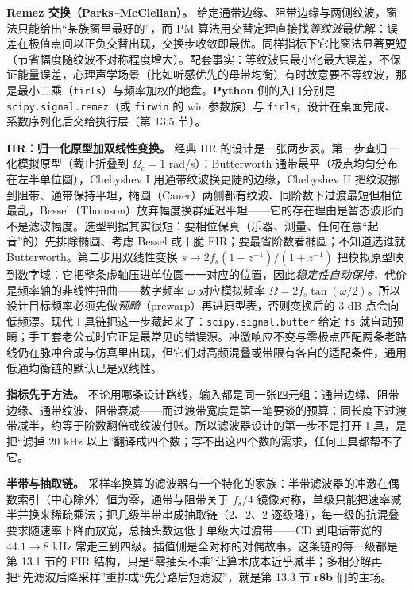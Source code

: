 \documentclass[12pt,a4paper,fontset=fandol]{ctexbook}
\newcommand{\Tp}[1]{\texttt{#1}}
\newcommand{\Lib}[1]{\textbf{#1}}
\newcommand{\Lang}[1]{\textsf{\bfseries #1}}
\newcommand{\PY}{\Lang{Python}}
\begin{document}
\textbf{Remez 交换（Parks--McClellan）。} 给定通带边缘、阻带边缘与两侧纹波，窗法只能给出``某族窗里最好的''，而 PM 算法用交替定理直接找\emph{等纹波}最优解：误差在极值点间以正负交替出现，交换步收敛即最优。同样指标下它比窗法显著更短（节省幅度随纹波不对称程度增大）。配套事实：等纹波只最小化最大误差，不保证能量误差，心理声学场景（比如听感优先的母带均衡）有时故意要不等纹波，那是最小二乘（\Tp{firls}）与频率加权的地盘。\PY{} 侧的入口分别是 \Tp{scipy.signal.remez}（或 \Tp{firwin} 的 win 参数族）与 \Tp{firls}，设计在桌面完成、系数序列化后交给执行层（第 13.5 节）。

\textbf{IIR：归一化原型加双线性变换。} 经典 IIR 的设计是一张两步表。第一步查归一化模拟原型（截止折叠到 $\Omega_c = 1$ rad/s）：Butterworth 通带最平（极点均匀分布在左半单位圆），Chebyshev I 用通带纹波换更陡的边缘，Chebyshev II 把纹波挪到阻带、通带保持平坦，椭圆（Cauer）两侧都有纹波、同阶数下过渡最短但相位最乱，Bessel（Thomson）放弃幅度换群延迟平坦——它的存在理由是暂态波形而不是滤波幅度。选型判据其实很短：要相位保真（乐器、测量、任何在意``起音''的）先排除椭圆、考虑 Bessel 或干脆 FIR；要最省阶数看椭圆；不知道选谁就 Butterworth。第二步用双线性变换 $s \to 2 f_s (1 - z^{-1})/(1 + z^{-1})$ 把模拟原型映到数字域：它把整条虚轴压进单位圆一一对应的位置，因此\emph{稳定性自动保持}，代价是频率轴的非线性扭曲——数字频率 $\omega$ 对应模拟频率 $\Omega = 2 f_s \tan(\omega/2)$。所以设计目标频率必须先做\emph{预畸}（prewarp）再进原型表，否则变换后的 3 dB 点会向低频漂。现代工具链把这一步藏起来了：\Tp{scipy.signal.butter} 给定 \Tp{fs} 就自动预畸；手工套老公式时它正是最常见的错误源。冲激响应不变与零极点匹配两条老路线仍在脉冲合成与仿真里出现，但它们对高频混叠或带限有各自的适配条件，通用低通均衡链的默认已是双线性。

\textbf{指标先于方法。} 不论用哪条设计路线，输入都是同一张四元组：通带边缘、阻带边缘、通带纹波、阻带衰减——而过渡带宽度是第一笔要谈的预算：同长度下过渡带减半，约等于阶数翻倍或纹波付账。所以滤波器设计的第一步不是打开工具，是把``滤掉 20 kHz 以上''翻译成四个数；写不出这四个数的需求，任何工具都帮不了它。

\textbf{半带与抽取链。} 采样率换算的滤波器有一个特化的家族：半带滤波器的冲激在偶数索引（中心除外）恒为零，通带与阻带关于 $f_s/4$ 镜像对称，单级只能把速率减半并换来稀疏乘法；把几级半带串成抽取链（$2$、$2$、$2$ 逐级降），每一级的抗混叠要求随速率下降而放宽，总抽头数远低于单级大过渡带——CD 到电话带宽的 $44.1 \to 8$ kHz 常走三到四级。插值侧是全对称的对偶故事。这条链的每一级都是第 13.1 节的 FIR 结构，只是``零抽头不乘''让算术成本近乎减半；多相分解再把``先滤波后降采样''重排成``先分路后短滤波''，就是第 13.3 节 \Lib{r8b} 们的主场。
\end{document}
